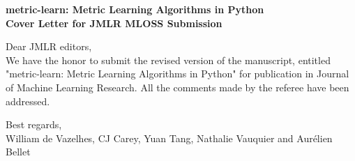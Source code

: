 \documentclass[a4paper]{article}
\begin{document}
\begin{center}
{\Large \bf metric-learn: Metric Learning Algorithms in Python\\\vspace{.5cm}Cover Letter for JMLR MLOSS Submission}
\vspace{1cm}
\end{center}

Dear JMLR editors,\\

We have the honor to submit the revised version of the manuscript, entitled "metric-learn: Metric Learning Algorithms in Python" for publication in Journal of Machine Learning Research. All the comments made by the referee have been addressed.

Best regards,\\

William de Vazelhes, CJ Carey, Yuan Tang, Nathalie Vauquier and Aur\'elien Bellet
\end{document}
